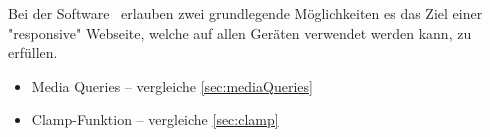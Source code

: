 

Bei der Software \ZELIA\ erlauben zwei grundlegende Möglichkeiten es das Ziel einer "responsive" Webseite, welche auf allen Geräten verwendet werden kann, zu erfüllen.

\begin{itemize}
    \item Media Queries -- vergleiche \ref{sec:mediaQueries}
    \item Clamp-Funktion -- vergleiche \ref{sec:clamp}
\end{itemize}



\clearpage
